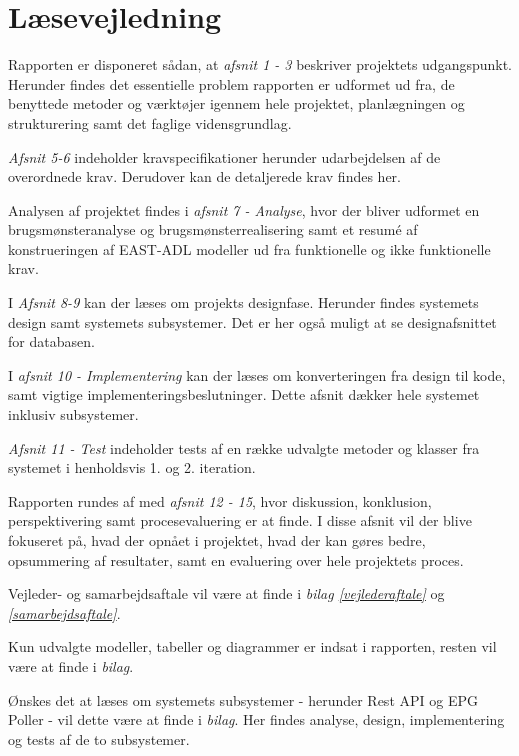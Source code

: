\section{Læsevejledning}

Rapporten er disponeret sådan, at \textit{afsnit 1 - 3} beskriver projektets udgangspunkt. Herunder findes det essentielle problem rapporten er udformet ud fra, de benyttede metoder og værktøjer igennem hele projektet, planlægningen og strukturering samt det faglige vidensgrundlag.

\textit{Afsnit 5-6} indeholder kravspecifikationer herunder udarbejdelsen af de overordnede krav. Derudover kan de detaljerede krav findes her.

Analysen af projektet findes i \textit{afsnit 7 - Analyse}, hvor der bliver udformet en brugsmønsteranalyse og brugsmønsterrealisering samt et resumé af konstrueringen af EAST-ADL modeller ud fra funktionelle og ikke funktionelle krav.

I \textit{Afsnit 8-9} kan der læses om projekts designfase. Herunder findes systemets design samt systemets subsystemer. Det er her også muligt at se designafsnittet for databasen.

I \textit{afsnit 10 - Implementering} kan der læses om konverteringen fra design til kode, samt vigtige implementeringsbeslutninger. Dette afsnit dækker hele systemet inklusiv subsystemer.

\textit{Afsnit 11 - Test} indeholder tests af en række udvalgte metoder og klasser fra systemet i henholdsvis 1. og 2. iteration.

Rapporten rundes af med \textit{afsnit 12 - 15}, hvor diskussion, konklusion, perspektivering samt procesevaluering er at finde. I disse afsnit vil der blive fokuseret på, hvad der opnået i projektet, hvad der kan gøres bedre, opsummering af resultater, samt en evaluering over hele projektets proces.

Vejleder- og samarbejdsaftale vil være at finde i \textit{bilag \ref{vejlederaftale}} og \textit{\ref{samarbejdsaftale}}.

Kun udvalgte modeller, tabeller og diagrammer er indsat i rapporten, resten vil være at finde i \textit{bilag}.

Ønskes det at læses om systemets subsystemer - herunder Rest API og EPG Poller - vil dette være at finde i \textit{bilag}. Her findes analyse, design, implementering og tests af de to subsystemer.
